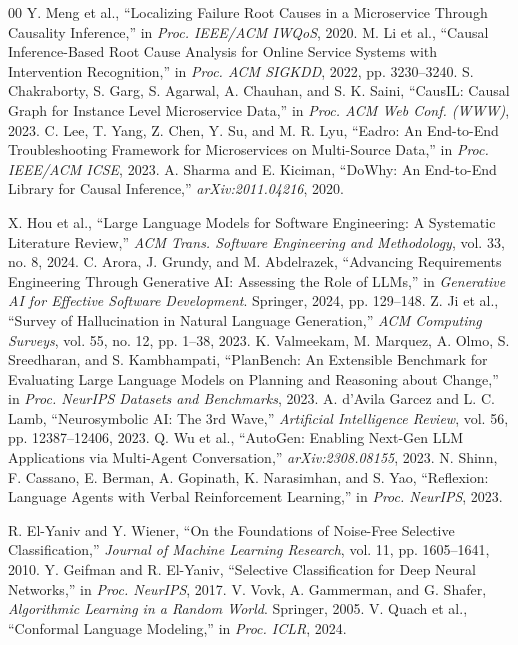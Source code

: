 \documentclass[journal, 10pt]{IEEEtran}
\begin{document}
\begin{thebibliography}{00}
Y. Meng et al., ``Localizing Failure Root Causes in a Microservice Through Causality Inference,'' in \emph{Proc. IEEE/ACM IWQoS}, 2020.
M. Li et al., ``Causal Inference-Based Root Cause Analysis for Online Service Systems with Intervention Recognition,'' in \emph{Proc. ACM SIGKDD}, 2022, pp. 3230--3240.
S. Chakraborty, S. Garg, S. Agarwal, A. Chauhan, and S. K. Saini, ``CausIL: Causal Graph for Instance Level Microservice Data,'' in \emph{Proc. ACM Web Conf. (WWW)}, 2023.
C. Lee, T. Yang, Z. Chen, Y. Su, and M. R. Lyu, ``Eadro: An End-to-End Troubleshooting Framework for Microservices on Multi-Source Data,'' in \emph{Proc. IEEE/ACM ICSE}, 2023.
A. Sharma and E. Kiciman, ``DoWhy: An End-to-End Library for Causal Inference,'' \emph{arXiv:2011.04216}, 2020.

X. Hou et al., ``Large Language Models for Software Engineering: A Systematic Literature Review,'' \emph{ACM Trans. Software Engineering and Methodology}, vol. 33, no. 8, 2024.
C. Arora, J. Grundy, and M. Abdelrazek, ``Advancing Requirements Engineering Through Generative AI: Assessing the Role of LLMs,'' in \emph{Generative AI for Effective Software Development}. Springer, 2024, pp. 129--148.
Z. Ji et al., ``Survey of Hallucination in Natural Language Generation,'' \emph{ACM Computing Surveys}, vol. 55, no. 12, pp. 1--38, 2023.
K. Valmeekam, M. Marquez, A. Olmo, S. Sreedharan, and S. Kambhampati, ``PlanBench: An Extensible Benchmark for Evaluating Large Language Models on Planning and Reasoning about Change,'' in \emph{Proc. NeurIPS Datasets and Benchmarks}, 2023.
A. d'Avila Garcez and L. C. Lamb, ``Neurosymbolic AI: The 3rd Wave,'' \emph{Artificial Intelligence Review}, vol. 56, pp. 12387--12406, 2023.
Q. Wu et al., ``AutoGen: Enabling Next-Gen LLM Applications via Multi-Agent Conversation,'' \emph{arXiv:2308.08155}, 2023.
N. Shinn, F. Cassano, E. Berman, A. Gopinath, K. Narasimhan, and S. Yao, ``Reflexion: Language Agents with Verbal Reinforcement Learning,'' in \emph{Proc. NeurIPS}, 2023.

R. El-Yaniv and Y. Wiener, ``On the Foundations of Noise-Free Selective Classification,'' \emph{Journal of Machine Learning Research}, vol. 11, pp. 1605--1641, 2010.
Y. Geifman and R. El-Yaniv, ``Selective Classification for Deep Neural Networks,'' in \emph{Proc. NeurIPS}, 2017.
V. Vovk, A. Gammerman, and G. Shafer, \emph{Algorithmic Learning in a Random World}. Springer, 2005.
V. Quach et al., ``Conformal Language Modeling,'' in \emph{Proc. ICLR}, 2024.


\end{thebibliography}
\end{document}
